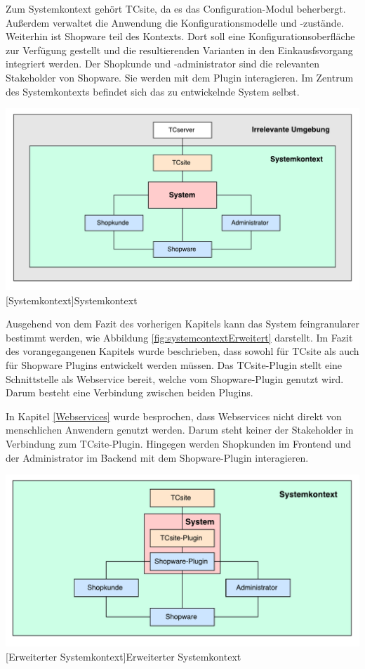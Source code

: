 \documentclass[11pt, a4paper, titlepage, listof=totoc, bibliography=totoc, index=totoc, twoside, openright, headings=normal]{scrreprt}
\begin{document}
Zum Systemkontext gehört TCsite, da es das Configuration-Modul beherbergt. Außerdem verwaltet die Anwendung die Konfigurationsmodelle und -zustände. Weiterhin ist Shopware teil des Kontexts. Dort soll eine Konfigurationsoberfläche zur Verfügung gestellt und die resultierenden Varianten in den Einkausfsvorgang integriert werden. Der Shopkunde und -administrator sind die relevanten Stakeholder von Shopware. Sie werden mit dem Plugin interagieren.
Im Zentrum des Systemkontexts befindet sich das zu entwickelnde System selbst.

\vspace{1em}
\begin{minipage}{\linewidth}
	\centering
	\includegraphics[width=0.8\linewidth]{Abbildungen/systemcontext.pdf}
	[Systemkontext]{Systemkontext}
	\label{fig:systemcontext}
\end{minipage}
\vspace{0.3em}

Ausgehend von dem Fazit des vorherigen Kapitels kann das System feingranularer bestimmt werden, wie Abbildung \ref{fig:systemcontextErweitert} darstellt. Im Fazit des vorangegangenen Kapitels wurde beschrieben, dass sowohl für TCsite als auch für Shopware Plugins entwickelt werden müssen. Das TCsite-Plugin stellt eine Schnittstelle als Webservice bereit, welche vom Shopware-Plugin genutzt wird. Darum besteht eine Verbindung zwischen beiden Plugins.

In Kapitel \ref{Webservices} wurde besprochen, dass Webservices nicht direkt von menschlichen Anwendern genutzt werden. Darum steht keiner der Stakeholder in Verbindung zum TCsite-Plugin. Hingegen werden Shopkunden im Frontend und der Administrator im Backend mit dem Shopware-Plugin interagieren.

\vspace{1em}
\begin{minipage}{\linewidth}
	\centering
	\includegraphics[width=0.8\linewidth]{Abbildungen/systemcontextErweitert.pdf}
	[Erweiterter Systemkontext]{Erweiterter Systemkontext}
	\label{fig:systemcontextErweitert}
\end{minipage}
\vspace{0.3em}
\end{document}
